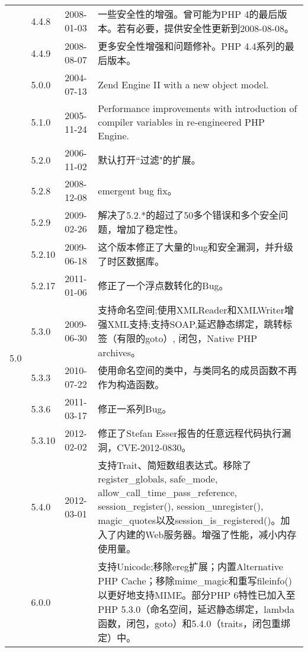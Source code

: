 \begin{longtable}{|m{16pt}|m{20pt}|m{35pt}|m{300pt}|}
		&4.4.8	&2008-01-03	&一些安全性的增强。曾可能为PHP 4的最后版本。若有必要，提供安全性更新到2008-08-08。\\ \cline{2-4}

		&4.4.9	&2008-08-07	&更多安全性增强和问题修补。PHP 4.4系列的最后版本。\\ \cline{2-4}
\hline
\multirow{18}{40pt}{5.0}		&5.0.0	&2004-07-13	&Zend Engine II with a new object model.\\ \cline{2-4}

		&5.1.0	&2005-11-24	&Performance improvements with introduction of compiler variables in re-engineered PHP Engine.\\ \cline{2-4}

		&5.2.0	&2006-11-02	&默认打开``过滤"的扩展。\\ \cline{2-4}

		&5.2.8	&2008-12-08	&emergent bug fix。\\ \cline{2-4}

		&5.2.9	&2009-02-26	&解决了5.2.*的超过了50多个错误和多个安全问题，增加了稳定性。\\ \cline{2-4}

		&5.2.10&2009-06-18	&这个版本修正了大量的bug和安全漏洞，并升级了时区数据库。\\ \cline{2-4}

		&5.2.17&2011-01-06	&修正了一个浮点数转化的Bug。\\ \cline{2-4}

		&5.3.0	&2009-06-30	&支持命名空间;\newline 使用XMLReader和XMLWriter增强XML支持;\newline 支持SOAP,延迟静态绑定，跳转标签（有限的goto）, 闭包，Native PHP archives。\\ \cline{2-4}

		&5.3.3	&2010-07-22	&使用命名空间的类中，与类同名的成员函数不再作为构造函数。\\ \cline{2-4}

		&5.3.6	&2011-03-17	&修正一系列Bug。\\ \cline{2-4}

		&5.3.10&2012-02-02	&修正了Stefan Esser报告的任意远程代码执行漏洞，CVE-2012-0830。\\ \cline{2-4}

		&5.4.0	&2012-03-01	&支持Trait、简短数组表达式。\newline 移除了register\_globals, safe\_mode, allow\_call\_time\_pass\_reference, session\_register(), session\_unregister(), magic\_quotes以及session\_is\_registered()。\newline 加入了内建的Web服务器。\newline 增强了性能，减小内存使用量。\\ \cline{2-4}
\hline
6.0		&6.0.0	&	&支持Unicode;移除ereg扩展；\newline 内置Alternative PHP Cache；\newline 移除mime\_magic和重写fileinfo()以更好地支持MIME。\newline 部分PHP 6特性已加入至PHP 5.3.0（命名空间，延迟静态绑定，lambda函数，闭包，goto）和5.4.0（traits，闭包重绑定）中。\\ 
\hline
\end{longtable}
